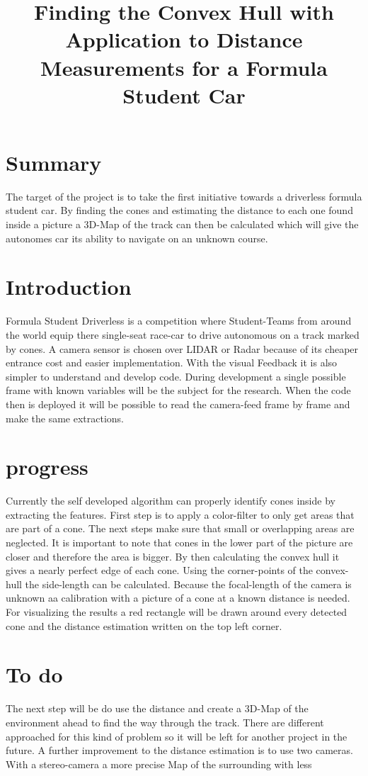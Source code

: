 \documentclass[10pt,a4paper]{article}
\title{Finding the Convex Hull with Application to Distance Measurements for a Formula Student Car}
\begin{document}
	\maketitle
	
	\section{Summary}
	The target of the project is to take the first initiative towards a driverless formula student car. By finding the cones and estimating the distance to each one found inside a picture a 3D-Map of the track can then be calculated which will give the autonomes car its ability to navigate on an unknown course. 
	
	\section{Introduction}
	Formula Student Driverless is a competition where Student-Teams from around the world equip there single-seat race-car to drive autonomous on a track marked by cones. A camera sensor is chosen over LIDAR or Radar because of its cheaper entrance cost and easier implementation. With the visual Feedback it is also simpler to understand and develop code. During development a single possible frame with known variables will be the subject for the research. When the code then is deployed it will be possible to read the camera-feed frame by frame and make the same extractions.
	
	\section{progress}
	Currently the self developed algorithm can properly identify cones inside by extracting the features. 
	First step is to apply a color-filter to only get areas that are part of a cone.
	The next steps make sure that small or overlapping areas are neglected. It is important to note that cones in the lower part of the picture are closer and therefore the area is bigger. By then calculating the convex hull it gives a nearly perfect edge of each cone.
	Using the corner-points of the convex-hull the side-length can be calculated. Because the focal-length of the camera is unknown aa calibration with a picture of a cone at a known distance is needed.
	For visualizing the results a red rectangle will be drawn around every detected cone and the distance estimation written on the top left corner.
	
	\section{To do}
	The next step will be do use the distance and create a 3D-Map of the environment ahead to find the way through the track. There are different approached for this kind of problem so it will be left for another project in the future.
	A further improvement to the distance estimation is to use two cameras. With a stereo-camera a more precise Map of the surrounding with less 
	
\end{document}
